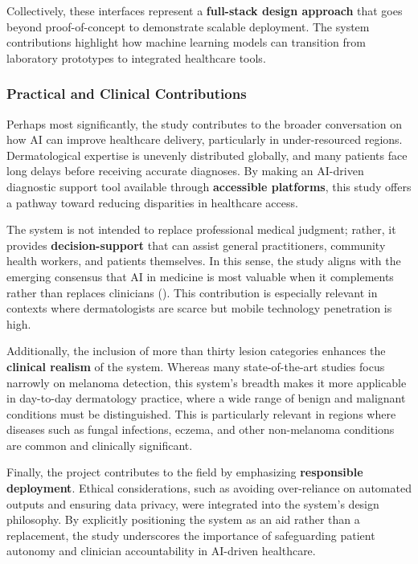 \documentclass[
  12pt,
  oneside]{article}
\begin{document}
Collectively, these interfaces represent a \textbf{full-stack design
approach} that goes beyond proof-of-concept to demonstrate scalable
deployment. The system contributions highlight how machine learning
models can transition from laboratory prototypes to integrated
healthcare tools.

\subsubsection{Practical and Clinical
Contributions}\label{practical-and-clinical-contributions}

Perhaps most significantly, the study contributes to the broader
conversation on how AI can improve healthcare delivery, particularly in
under-resourced regions. Dermatological expertise is unevenly
distributed globally, and many patients face long delays before
receiving accurate diagnoses. By making an AI-driven diagnostic support
tool available through \textbf{accessible platforms}, this study offers
a pathway toward reducing disparities in healthcare access.

The system is not intended to replace professional medical judgment;
rather, it provides \textbf{decision-support} that can assist general
practitioners, community health workers, and patients themselves. In
this sense, the study aligns with the emerging consensus that AI in
medicine is most valuable when it complements rather than replaces
clinicians (). This
contribution is especially relevant in contexts where dermatologists are
scarce but mobile technology penetration is high.

Additionally, the inclusion of more than thirty lesion categories
enhances the \textbf{clinical realism} of the system. Whereas many
state-of-the-art studies focus narrowly on melanoma detection, this
system's breadth makes it more applicable in day-to-day dermatology
practice, where a wide range of benign and malignant conditions must be
distinguished. This is particularly relevant in regions where diseases
such as fungal infections, eczema, and other non-melanoma conditions are
common and clinically significant.

Finally, the project contributes to the field by emphasizing
\textbf{responsible deployment}. Ethical considerations, such as
avoiding over-reliance on automated outputs and ensuring data privacy,
were integrated into the system's design philosophy. By explicitly
positioning the system as an aid rather than a replacement, the study
underscores the importance of safeguarding patient autonomy and
clinician accountability in AI-driven healthcare.
\end{document}

